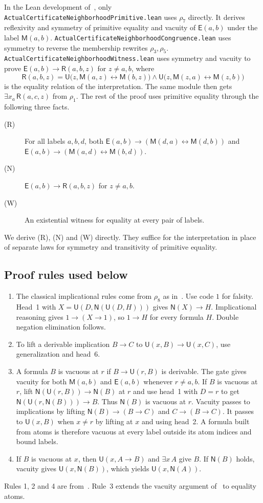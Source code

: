 \documentclass[11pt,letterpaper]{article}
\newcommand{\Mc}{\mathsf{M}}
\newcommand{\Uc}{\mathsf{U}}
\newcommand{\Ec}{\mathsf{E}}
\newcommand{\Nc}{\mathsf{N}}
\newcommand{\Rc}{\mathsf{R}}
\newcommand{\file}[1]{\texttt{\nolinkurl{#1}}}
\begin{document}
In the Lean development of~\cite{pa209}, only
\file{ActualCertificateNeighborhoodPrimitive.lean} uses $\rho_7$
directly. It derives reflexivity and symmetry of primitive equality
and vacuity of $\Ec(a,b)$ under the label $\Mc(a,b)$.
\file{ActualCertificateNeighborhoodCongruence.lean} uses symmetry
to reverse the membership rewrites $\rho_3,\rho_5$.
\file{ActualCertificateNeighborhoodWitness.lean} uses symmetry and
vacuity to prove $\Ec(a,b)\to\Rc(a,b,z)$ for $z\ne a,b$, where
\[
 \Rc(a,b,z)=\Uc\bigl(z,\Mc(a,z)\leftrightarrow\Mc(b,z)\bigr)\wedge
            \Uc\bigl(z,\Mc(z,a)\leftrightarrow\Mc(z,b)\bigr)
\]
is the equality relation of the interpretation. The same module
then gets $\exists x_a\,\Rc(a,c,z)$ from $\rho_1$. The rest of the
proof uses primitive equality through the following three facts.
\begin{description}
\item[(R)] For all labels $a,b,d$, both
  $\Ec(a,b)\to(\Mc(d,a)\leftrightarrow\Mc(d,b))$ and
  $\Ec(a,b)\to(\Mc(a,d)\leftrightarrow\Mc(b,d))$.
\item[(N)] $\Ec(a,b)\to\Rc(a,b,z)$ for $z\ne a,b$.
\item[(W)] An existential witness for equality at every pair of labels.
\end{description}
We derive (R), (N) and (W) directly. They suffice for the interpretation
in place of separate laws for symmetry and transitivity of primitive
equality.

\subsection{Proof rules used below}\label{sec:tools}

\begin{enumerate}
\item The classical implicational rules come from $\rho_8$ as
  in~\cite{pa209}. Use code $1$ for falsity. Head~1 with
  $X=\Uc(D,\Nc(\Uc(D,H)))$ gives $\Nc(X)\to H$. Implicational
  reasoning gives $1\to(X\to1)$, so $1\to H$ for every formula $H$.
  Double negation elimination follows.
\item To lift a derivable implication $B\to C$ to
  $\Uc(x,B)\to\Uc(x,C)$, use generalization and head~6.
\item A formula $B$ is vacuous at $r$ if $B\to\Uc(r,B)$ is
  derivable. The gate gives vacuity for both $\Mc(a,b)$ and
  $\Ec(a,b)$ whenever $r\ne a,b$. If $B$ is vacuous at $r$, lift
  $\Nc(\Uc(r,B))\to\Nc(B)$ at $r$ and use head~1 with $D=r$
  to get $\Nc(\Uc(r,\Nc(B)))\to B$. Thus $\Nc(B)$ is vacuous at $r$.
  Vacuity passes to implications by lifting $\Nc(B)\to(B\to C)$ and
  $C\to(B\to C)$. It passes to $\Uc(x,B)$ when $x\ne r$ by lifting
  at $x$ and using head~2. A formula built from atoms is therefore
  vacuous at every label outside its atom indices and bound labels.
\item If $B$ is vacuous at $x$, then $\Uc(x,A\to B)$ and
  $\exists x\,A$ give $B$. If $\Nc(B)$ holds, vacuity gives
  $\Uc(x,\Nc(B))$, which yields $\Uc(x,\Nc(A))$.
\end{enumerate}
Rules 1, 2 and 4 are from~\cite{pa209}. Rule~3 extends the vacuity
argument of~\cite{pa209} to equality atoms.
\end{document}
